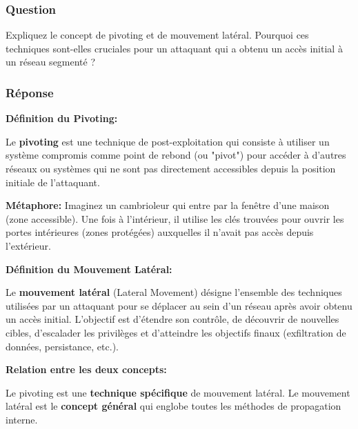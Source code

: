 \documentclass[12pt,a4paper,openany]{report}
\begin{document}
	\subsubsection{Question}
	
	Expliquez le concept de pivoting et de mouvement latéral. Pourquoi ces 
	techniques sont-elles cruciales pour un attaquant qui a obtenu un accès 
	initial à un réseau segmenté ?
	
	\subsubsection{Réponse}
	
	\textbf{Définition du Pivoting:}
	
	Le \textbf{pivoting} est une technique de post-exploitation qui consiste 
	à utiliser un système compromis comme point de rebond (ou "pivot") pour 
	accéder à d'autres réseaux ou systèmes qui ne sont pas directement 
	accessibles depuis la position initiale de l'attaquant.
	
	\textbf{Métaphore:} Imaginez un cambrioleur qui entre par la fenêtre 
	d'une maison (zone accessible). Une fois à l'intérieur, il utilise les 
	clés trouvées pour ouvrir les portes intérieures (zones protégées) 
	auxquelles il n'avait pas accès depuis l'extérieur.
	
	\textbf{Définition du Mouvement Latéral:}
	
	Le \textbf{mouvement latéral} (Lateral Movement) désigne l'ensemble des 
	techniques utilisées par un attaquant pour se déplacer au sein d'un réseau 
	après avoir obtenu un accès initial. L'objectif est d'étendre son contrôle, 
	de découvrir de nouvelles cibles, d'escalader les privilèges et d'atteindre 
	les objectifs finaux (exfiltration de données, persistance, etc.).
	
	\textbf{Relation entre les deux concepts:}
	
	Le pivoting est une \textbf{technique spécifique} de mouvement latéral. 
	Le mouvement latéral est le \textbf{concept général} qui englobe toutes 
	les méthodes de propagation interne.
	
\end{document}
